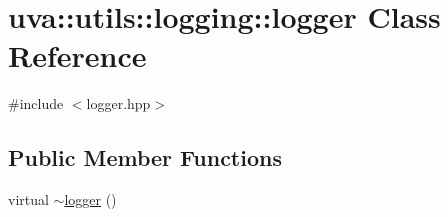 \hypertarget{classuva_1_1utils_1_1logging_1_1logger}{}\section{uva\+:\+:utils\+:\+:logging\+:\+:logger Class Reference}
\label{classuva_1_1utils_1_1logging_1_1logger}


{\ttfamily \#include $<$logger.\+hpp$>$}

\subsection*{Public Member Functions}
\begin{DoxyCompactItemize}
\item 
virtual \hyperlink{classuva_1_1utils_1_1logging_1_1logger_aa695cb753a0876924c993863b8cd44d1}{$\sim$logger} ()
\end{DoxyCompactItemize}
